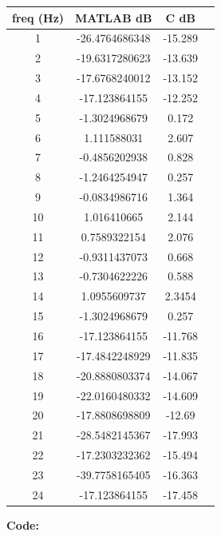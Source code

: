 \documentclass{article}
\begin{document}
\begin{center}
\begin{tabular}{c|c|c|c}
freq (Hz)	& MATLAB dB	& C dB \\ \hline
1	   & -26.4764686348	 & -15.289 \\ \hline
2	   & -19.6317280623	 & -13.639 \\ \hline
3	   & -17.6768240012	 & -13.152 \\ \hline
4	   & -17.123864155	 & -12.252 \\ \hline
5	   & -1.3024968679	 & 0.172   \\ \hline
6	   & 1.111588031	   & 2.607   \\ \hline
7	   & -0.4856202938	 & 0.828   \\ \hline
8	   & -1.2464254947	 & 0.257   \\ \hline
9	   & -0.0834986716	 & 1.364   \\ \hline
10	 & 1.016410665	   & 2.144   \\ \hline
11	 & 0.7589322154	   & 2.076   \\ \hline
12	 & -0.9311437073	 & 0.668   \\ \hline
13	 & -0.7304622226	 & 0.588   \\ \hline
14	 & 1.0955609737	   & 2.3454  \\ \hline
15	 & -1.3024968679	 & 0.257   \\ \hline
16	 & -17.123864155	 & -11.768 \\ \hline
17	 & -17.4842248929	 & -11.835 \\ \hline
18	 & -20.8880803374	 & -14.067 \\ \hline
19	 & -22.0160480332	 & -14.609 \\ \hline
20	 & -17.8808698809	 & -12.69  \\ \hline
21	 & -28.5482145367	 & -17.993 \\ \hline
22	 & -17.2303232362	 & -15.494 \\ \hline
23	 & -39.7758165405	 & -16.363 \\ \hline
24	 & -17.123864155	 & -17.458 \\ \hline
\end{tabular}
\end{center}

\pagebreak
\textbf{Code:}
\end{document}
